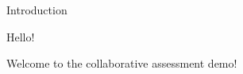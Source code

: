 
\begin{edXchapter}{Introduction}

%

\begin{edXtext}{Hello!}

Welcome to the collaborative assessment demo!


\end{edXtext}
%
%

\end{edXchapter}
